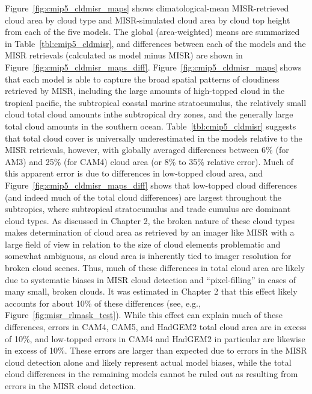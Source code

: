 Figure~\ref{fig:cmip5_cldmisr_maps} shows climatological-mean
MISR-retrieved cloud area by cloud type and MISR-simulated cloud area by
cloud top height from each of the five models. The global
(area-weighted) means are summarized in Table~\ref{tbl:cmip5_cldmisr},
and differences between each of the models and the MISR retrievals
(calculated as model minus MISR) are shown in
Figure~\ref{fig:cmip5_cldmisr_maps_diff}.
Figure~\ref{fig:cmip5_cldmisr_maps} shows that each model is able to
capture the broad spatial patterns of cloudiness retrieved by MISR,
including the large amounts of high-topped cloud in the tropical
pacific, the subtropical coastal marine stratocumulus, the relatively
small cloud total cloud amounts inthe subtropical dry zones, and the
generally large total cloud amounts in the southern ocean.
Table~\ref{tbl:cmip5_cldmisr} suggests that total cloud cover is
universally underestimated in the models relative to the MISR
retrievals, however, with globally averaged differences between 6\% (for
AM3) and 25\% (for CAM4) cloud area (or 8\% to 35\% relative error).
Much of this apparent error is due to differences in low-topped cloud
area, and Figure~\ref{fig:cmip5_cldmisr_maps_diff} shows that low-topped
cloud differences (and indeed much of the total cloud differences) are
largest throughout the subtropics, where subtropical stratocumulus and
trade cumulus are dominant cloud types. As discussed in Chapter 2, the
broken nature of these cloud types makes determination of cloud area as
retrieved by an imager like MISR with a large field of view in relation
to the size of cloud elements problematic and somewhat ambiguous, as
cloud area is inherently tied to imager resolution for broken cloud
scenes. Thus, much of these differences in total cloud area are likely
due to systematic biases in MISR cloud detection and ``pixel-filling''
in cases of many small, broken clouds. It was estimated in Chapter 2
that this effect likely accounts for about 10\% of these differences
(see, e.g., Figure~\ref{fig:misr_rlmask_test}). While this effect can
explain much of these differences, errors in CAM4, CAM5, and HadGEM2
total cloud area are in excess of 10\%, and low-topped errors in CAM4
and HadGEM2 in particular are likewise in excess of 10\%. These errors
are larger than expected due to errors in the MISR cloud detection alone
and likely represent actual model biases, while the total cloud
differences in the remaining models cannot be ruled out as resulting
from errors in the MISR cloud detection.

